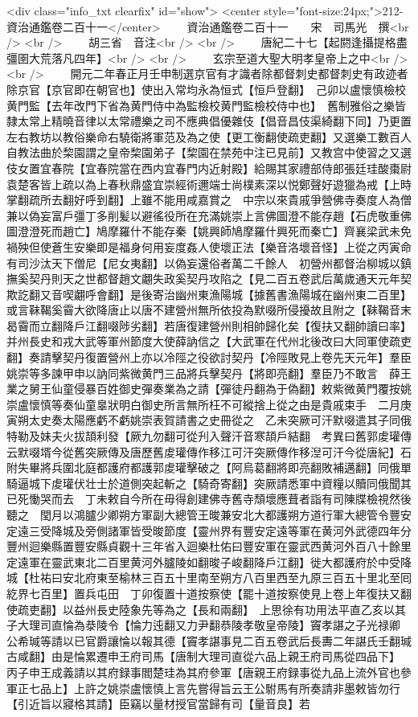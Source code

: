 <div class="info_txt clearfix" id="show">
<center style="font-size:24px;">212-資治通鑑卷二百十一</center>
  　　資治通鑑卷二百十一　　宋　司馬光　撰<br />
<br />
　　胡三省　音注<br />
<br />
　　唐紀二十七【起閼逢攝提格盡彊圉大荒落凡四年】<br />
<br />
　　玄宗至道大聖大明孝皇帝上之中<br />
<br />
　　開元二年春正月壬申制選京官有才識者除都督刺史都督刺史有政迹者除京官【京官即在朝官也】使出入常均永為恒式【恒戶登翻】　己卯以盧懷慎檢校黄門監【去年改門下省為黄門侍中為監檢校黄門監檢校侍中也】　舊制雅俗之樂皆隸太常上精曉音律以太常禮樂之司不應典倡優雜伎【倡音昌伎渠綺翻下同】乃更置左右教坊以教俗樂命右驍衛將軍范及為之使【更工衡翻使疏吏翻】又選樂工數百人自教法曲於棃園謂之皇帝棃園弟子【棃園在禁苑中注已見前】又教宫中使習之又選伎女置宜春院【宜春院當在西内宜春門内近射殿】給賜其家禮部侍郎張廷珪酸棗尉袁楚客皆上疏以為上春秋鼎盛宜崇經術邇端士尚樸素深以悦鄭聲好遊獵為戒【上時掌翻疏所去翻好呼到翻】上雖不能用咸嘉賞之　中宗以來貴戚爭營佛寺奏度人為僧兼以偽妄富戶彊丁多削髪以避徭役所在充滿姚崇上言佛圖澄不能存趙【石虎敬重佛圖澄澄死而趙亡】鳩摩羅什不能存秦【姚興師鳩摩羅什興死而秦亡】齊襄梁武未免禍殃但使蒼生安樂即是福身何用妄度姦人使壞正法【樂音洛壞音怪】上從之丙寅命有司沙汰天下僧尼【尼女夷翻】以偽妄還俗者萬二千餘人　初營州都督治柳城以鎮撫奚契丹則天之世都督趙文翽失政奚契丹攻陷之【見二百五卷武后萬歲通天元年契欺訖翻又音喫翽呼會翻】是後寄治幽州東漁陽城【據舊書漁陽城在幽州東二百里】或言靺鞨奚霫大欲降唐止以唐不建營州無所依投為默啜所侵擾故且附之【靺鞨音末曷霫而立翻降戶江翻啜陟劣翻】若唐復建營州則相帥歸化矣【復扶又翻帥讀曰率】并州長史和戎大武等軍州節度大使薛訥信之【大武軍在代州北後改曰大同軍使疏吏翻】奏請擊契丹復置營州上亦以冷陘之役欲討契丹【冷陘敗見上卷先天元年】羣臣姚崇等多諫甲申以訥同紫微黄門三品將兵擊契丹【將即亮翻】羣臣乃不敢言　薛王業之舅王仙童侵暴百姓御史彈奏業為之請【彈徒丹翻為于偽翻】敕紫微黄門覆按姚崇盧懷慎等奏仙童辠狀明白御史所言無所枉不可縱捨上從之由是貴戚束手　二月庚寅朔太史奏太陽應虧不虧姚崇表賀請書之史冊從之　乙未突厥可汗默啜遣其子同俄特勒及妹夫火拔頡利發【厥九勿翻可從刋入聲汗音寒頡戶結翻　考異曰舊郭䖍瓘傳云默啜壻今從舊突厥傳及唐歷舊䖍瓘傳作移江可汗突厥傳作移湼可汗今從唐紀】石附失畢將兵圍北庭都護府都護郭䖍瓘擊破之【阿烏葛翻將即亮翻敗補邁翻】同俄單騎逼城下䖍瓘伏壮士於道側突起斬之【騎奇寄翻】突厥請悉軍中資糧以贖同俄聞其已死慟哭而去　丁未敕自今所在毋得創建佛寺舊寺頹壞應葺者詣有司陳牒檢視然後聽之　閠月以鴻臚少卿朔方軍副大總管王晙兼安北大都護朔方道行軍大總管令豐安定遠三受降城及旁側諸軍皆受晙節度【靈州界有豐安定遠等軍在黄河外武德四年分豐州迴樂縣置豐安縣貞觀十三年省入迴樂杜佑曰豐安軍在靈武西黄河外百八十餘里定遠軍在靈武東北二百里黄河外臚陵如翻晙子峻翻降戶江翻】徙大都護府於中受降城【杜祐曰安北府東至榆林三百五十里南至朔方八百里西至九原三百五十里北至囘紇界七百里】置兵屯田　丁卯復置十道按察使【罷十道按察使見上卷上年復扶又翻使疏吏翻】以益州長史陸象先等為之【長和兩翻】　上思徐有功用法平直乙亥以其子大理司直惀為㳟陵令【惀力迍翻又力尹翻恭陵孝敬皇帝陵】竇孝諶之子光禄卿公希瑊等請以已官爵讓惀以報其德【竇孝諶事見二百五卷武后長夀二年諶氏壬翻瑊古咸翻】由是惀累遷申王府司馬【唐制大理司直從六品上親王府司馬從四品下】　丙子申王成義請以其府録事閻楚珪為其府參軍【唐親王府録事從九品上流外官也參軍正七品上】上許之姚崇盧懷慎上言先嘗得旨云王公駙馬有所奏請非墨敕皆勿行【引近旨以寢格其請】臣竊以量材授官當歸有司【量音良】若